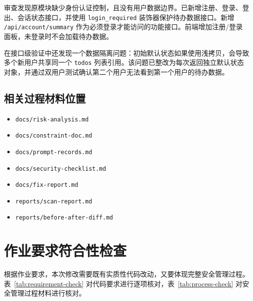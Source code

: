 \documentclass[12pt,a4paper]{ctexart}
\begin{document}
审查发现原模块缺少身份认证控制，且没有用户数据边界。已新增注册、登录、登出、会话状态接口，并使用 \texttt{login\_required} 装饰器保护待办数据接口。新增 \texttt{/api/account/summary} 作为必须登录才能访问的功能接口。前端增加注册/登录面板，未登录时不会加载待办数据。

在接口级验证中还发现一个数据隔离问题：初始默认状态如果使用浅拷贝，会导致多个新用户共享同一个 \texttt{todos} 列表引用。该问题已整改为每次返回独立默认状态对象，并通过双用户测试确认第二个用户无法看到第一个用户的待办数据。

\subsection*{相关过程材料位置}

\begin{itemize}[leftmargin=2.5em]
    \item \texttt{docs/risk-analysis.md}
    \item \texttt{docs/constraint-doc.md}
    \item \texttt{docs/prompt-records.md}
    \item \texttt{docs/security-checklist.md}
    \item \texttt{docs/fix-report.md}
    \item \texttt{reports/scan-report.md}
    \item \texttt{reports/before-after-diff.md}
\end{itemize}

\section{作业要求符合性检查}

根据作业要求，本次修改需要既有实质性代码改动，又要体现完整安全管理过程。表~\ref{tab:requirement-check} 对代码要求进行逐项核对，表~\ref{tab:process-check} 对安全管理过程材料进行核对。
\end{document}
